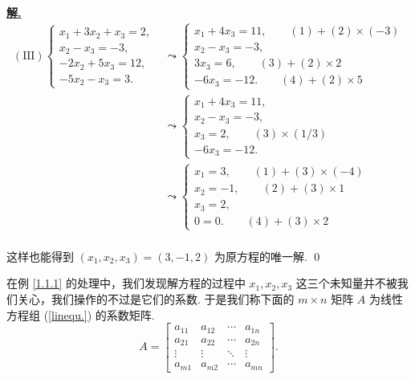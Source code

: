 \documentclass[10pt,openany]{article}
\theoremstyle{thmstyle} %
\theoremstyle{defstyle} %
\theoremstyle{prostyle} %
\theoremstyle{exastyle}
\theoremstyle{remstyle}
\newenvironment{solution}{\par\underline{\textbf{解.}} \;\fangsong}{\qed\par}
\begin{document}
\begin{solution}
	\begin{align*}
		(\text{III}) \left\{
		\begin{array}{l}
			x_1 + 3x_2 + x_3 = 2, \\
			x_2 - x_3 = -3, \\
			-2x_2 + 5x_3 = 12, \\
			-5x_2 - x_3 = 3.
		\end{array}
		\right. &\leadsto  \left\{
		\begin{array}{l}
			x_1 + 4x_3 = 11, \qquad (1)+(2) \times (-3)\\
			x_2 - x_3 = -3, \\
			3x_3 = 6, \qquad (3)+(2) \times 2 \\
			-6x_3 = -12. \qquad (4)+(2) \times 5 
		\end{array}
		\right. \\
		&\leadsto  \left\{
		\begin{array}{l}
			x_1 + 4x_3 = 11, \\
			x_2 - x_3 = -3, \\
			x_3 = 2, \qquad (3) \times (1/3) \\
			-6x_3 = -12. 
		\end{array}
		\right. \\
		&\leadsto  \left\{
		\begin{array}{l}
			x_1  = 3, \qquad (1)+(3) \times (-4)\\
			x_2  = -1, \qquad (2)+(3) \times 1 \\
			x_3 = 2,  \\
			0=0. \qquad (4)+(3) \times 2 
		\end{array}
		\right. \\
	\end{align*}
	
	这样也能得到 \( (x_1,x_2,x_3)=(3,-1,2) \) 为原方程的唯一解.
\end{solution}

在例 \ref{1.1.1} 的处理中，我们发现解方程的过程中 \( x_1,x_2,x_3 \) 这三个未知量并不被我们关心，我们操作的不过是它们的系数. 于是我们称下面的 \( m \times n \) 矩阵 \( A \) 为线性方程组 (\ref{linequ.}) 的系数矩阵.
\[ A=\begin{bmatrix}
	a_{11} & a_{12} & \cdots & a_{1n} \\
	a_{21} & a_{22} & \cdots & a_{2n} \\
	\vdots & \vdots & \ddots & \vdots \\
	a_{m1} & a_{m2} & \cdots & a_{mn}
\end{bmatrix}. \]
\end{document}
